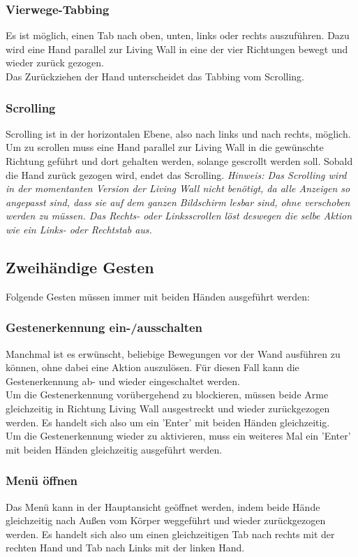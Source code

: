 \documentclass[10pt,a4paper]{report}
\begin{document}
		\subsubsection{Vierwege-Tabbing}
		Es ist möglich, einen Tab nach oben, unten, links oder rechts auszuführen. Dazu wird eine Hand parallel zur Living Wall in eine der vier Richtungen bewegt und wieder zurück gezogen.\\
Das Zurückziehen der Hand unterscheidet das Tabbing vom Scrolling.
		\subsubsection{Scrolling}
		Scrolling ist in der horizontalen Ebene, also nach links und nach rechts, möglich. Um zu scrollen muss eine Hand parallel zur Living Wall in die gewünschte Richtung geführt und dort gehalten werden, solange gescrollt werden soll. Sobald die Hand zurück gezogen wird, endet das Scrolling.
		\textit{Hinweis: Das Scrolling wird in der momentanten Version der Living Wall nicht benötigt, da alle Anzeigen so angepasst sind, dass sie auf dem ganzen Bildschirm lesbar sind, ohne verschoben werden zu müssen. Das Rechts- oder Linksscrollen löst deswegen die selbe Aktion wie ein Links- oder Rechtstab aus.}
		\subsection{Zweihändige Gesten}
		Folgende Gesten müssen immer mit beiden Händen ausgeführt werden:
		\subsubsection{Gestenerkennung ein-/ausschalten}
		Manchmal ist es erwünscht, beliebige Bewegungen vor der Wand ausführen zu können, ohne dabei eine Aktion auszulösen. Für diesen Fall kann die Gestenerkennung ab- und wieder eingeschaltet werden. \\
Um die Gestenerkennung vorübergehend zu blockieren, müssen beide Arme gleichzeitig in Richtung Living Wall ausgestreckt und wieder zurückgezogen werden. Es handelt sich also um ein 'Enter' mit beiden Händen gleichzeitig.\\
Um die Gestenerkennung wieder zu aktivieren, muss ein weiteres Mal ein 'Enter' mit beiden Händen gleichzeitig ausgeführt werden.
		\subsubsection{Menü öffnen}
		Das Menü kann in der Hauptansicht geöffnet werden, indem beide Hände gleichzeitig nach Außen vom Körper weggeführt und wieder zurückgezogen werden. Es handelt sich also um einen gleichzeitigen Tab nach rechts mit der rechten Hand und Tab nach Links mit der linken Hand.
\end{document}

